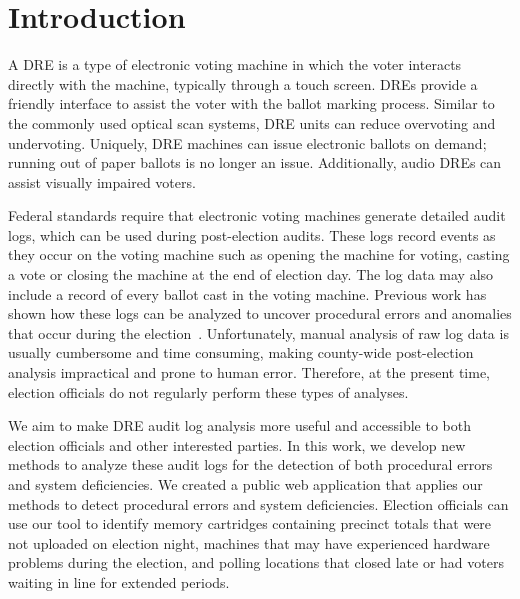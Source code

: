 \section{Introduction}

A DRE is a type of electronic voting machine in which the
voter interacts directly with the machine, typically through a touch
screen. DREs provide a friendly interface to assist the voter with the
ballot marking process. Similar to the commonly used optical scan
systems, DRE units can reduce overvoting and undervoting. Uniquely,
DRE machines can issue electronic ballots on demand; running out of
paper ballots is no longer an issue. Additionally, audio DREs can
assist visually impaired voters.
 
Federal standards require that electronic voting machines generate
detailed audit logs, which can be used during post-election
audits. These logs record events as they occur on the voting machine 
such as opening the machine for voting, casting a vote or closing the
machine at the end of election day. The log data may also include a
record of every ballot cast in the voting machine.  Previous work has
shown how these logs can be analyzed to uncover procedural errors and
anomalies that occur during the election~\cite{Buell2011}.
Unfortunately, manual analysis of raw log data is usually cumbersome
and time consuming, making county-wide post-election analysis
impractical and prone to human error. Therefore, at the present time,
election officials do not regularly perform these types of analyses. 

We aim to make DRE audit log analysis more useful and accessible to
both election officials and other interested parties. In this work, we
develop new methods to analyze these audit logs for the detection of
both procedural errors and system deficiencies. We created a public
web application that applies our methods to detect procedural errors
and system deficiencies.  Election officials can use our tool to
identify memory cartridges containing precinct totals that were not
uploaded on election night, machines that may have experienced
hardware problems during the election, and polling locations that
closed late or had voters waiting in line for extended periods.
 
